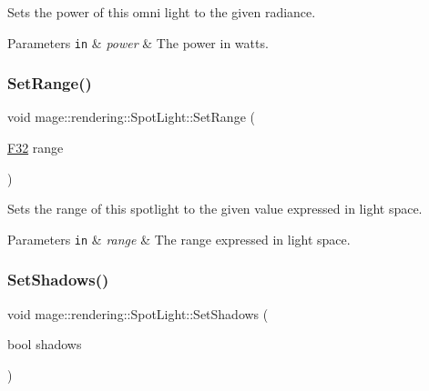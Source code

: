Sets the power of this omni light to the given radiance.


\begin{DoxyParams}[1]{Parameters}
\mbox{\tt in}  & {\em power} & The power in watts. \\
\hline
\end{DoxyParams}
\hypertarget{classmage_1_1rendering_1_1_spot_light_a87711b67a7a16809711f9841e4708720}{}\label{classmage_1_1rendering_1_1_spot_light_a87711b67a7a16809711f9841e4708720} 
\subsubsection{\texorpdfstring{Set\+Range()}{SetRange()}}
{\footnotesize\ttfamily void mage\+::rendering\+::\+Spot\+Light\+::\+Set\+Range (\begin{DoxyParamCaption}\item[{\hyperlink{namespacemage_aa97e833b45f06d60a0a9c4fc22ae02c0}{F32}}]{range }\end{DoxyParamCaption})\hspace{0.3cm}{\ttfamily [noexcept]}}

Sets the range of this spotlight to the given value expressed in light space.


\begin{DoxyParams}[1]{Parameters}
\mbox{\tt in}  & {\em range} & The range expressed in light space. \\
\hline
\end{DoxyParams}
\hypertarget{classmage_1_1rendering_1_1_spot_light_af1f1d3aee8bdcda50d16f4b0551e4728}{}\label{classmage_1_1rendering_1_1_spot_light_af1f1d3aee8bdcda50d16f4b0551e4728} 
\subsubsection{\texorpdfstring{Set\+Shadows()}{SetShadows()}}
{\footnotesize\ttfamily void mage\+::rendering\+::\+Spot\+Light\+::\+Set\+Shadows (\begin{DoxyParamCaption}\item[{bool}]{shadows }\end{DoxyParamCaption})\hspace{0.3cm}{\ttfamily [noexcept]}}

